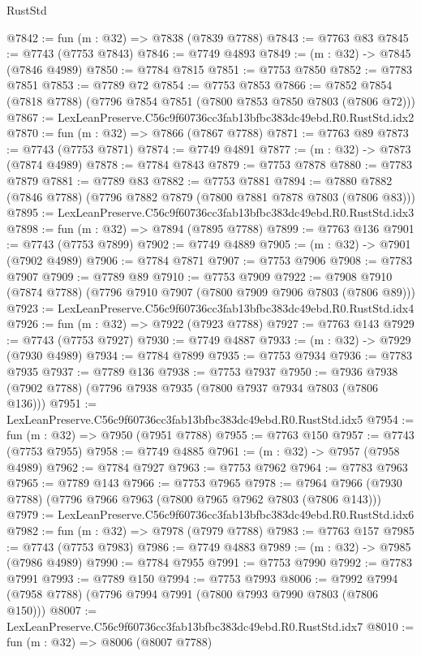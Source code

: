 \begin{lexlean}{RustStd}
\begin{coremodule}
@7842 := fun (m : @32) => @7838 (@7839 @7788)
@7843 := @7763 @83
@7845 := @7743 (@7753 @7843)
@7846 := @7749 @4893
@7849 := (m : @32) -> @7845 (@7846 @4989)
@7850 := @7784 @7815
@7851 := @7753 @7850
@7852 := @7783 @7851
@7853 := @7789 @72
@7854 := @7753 @7853
@7866 := @7852 @7854 (@7818 @7788) (@7796 @7854 @7851 (@7800 @7853 @7850 @7803 (@7806 @72)))
@7867 := LexLeanPreserve.C56c9f60736cc3fab13bfbc383dc49ebd.R0.RustStd.idx2
@7870 := fun (m : @32) => @7866 (@7867 @7788)
@7871 := @7763 @89
@7873 := @7743 (@7753 @7871)
@7874 := @7749 @4891
@7877 := (m : @32) -> @7873 (@7874 @4989)
@7878 := @7784 @7843
@7879 := @7753 @7878
@7880 := @7783 @7879
@7881 := @7789 @83
@7882 := @7753 @7881
@7894 := @7880 @7882 (@7846 @7788) (@7796 @7882 @7879 (@7800 @7881 @7878 @7803 (@7806 @83)))
@7895 := LexLeanPreserve.C56c9f60736cc3fab13bfbc383dc49ebd.R0.RustStd.idx3
@7898 := fun (m : @32) => @7894 (@7895 @7788)
@7899 := @7763 @136
@7901 := @7743 (@7753 @7899)
@7902 := @7749 @4889
@7905 := (m : @32) -> @7901 (@7902 @4989)
@7906 := @7784 @7871
@7907 := @7753 @7906
@7908 := @7783 @7907
@7909 := @7789 @89
@7910 := @7753 @7909
@7922 := @7908 @7910 (@7874 @7788) (@7796 @7910 @7907 (@7800 @7909 @7906 @7803 (@7806 @89)))
@7923 := LexLeanPreserve.C56c9f60736cc3fab13bfbc383dc49ebd.R0.RustStd.idx4
@7926 := fun (m : @32) => @7922 (@7923 @7788)
@7927 := @7763 @143
@7929 := @7743 (@7753 @7927)
@7930 := @7749 @4887
@7933 := (m : @32) -> @7929 (@7930 @4989)
@7934 := @7784 @7899
@7935 := @7753 @7934
@7936 := @7783 @7935
@7937 := @7789 @136
@7938 := @7753 @7937
@7950 := @7936 @7938 (@7902 @7788) (@7796 @7938 @7935 (@7800 @7937 @7934 @7803 (@7806 @136)))
@7951 := LexLeanPreserve.C56c9f60736cc3fab13bfbc383dc49ebd.R0.RustStd.idx5
@7954 := fun (m : @32) => @7950 (@7951 @7788)
@7955 := @7763 @150
@7957 := @7743 (@7753 @7955)
@7958 := @7749 @4885
@7961 := (m : @32) -> @7957 (@7958 @4989)
@7962 := @7784 @7927
@7963 := @7753 @7962
@7964 := @7783 @7963
@7965 := @7789 @143
@7966 := @7753 @7965
@7978 := @7964 @7966 (@7930 @7788) (@7796 @7966 @7963 (@7800 @7965 @7962 @7803 (@7806 @143)))
@7979 := LexLeanPreserve.C56c9f60736cc3fab13bfbc383dc49ebd.R0.RustStd.idx6
@7982 := fun (m : @32) => @7978 (@7979 @7788)
@7983 := @7763 @157
@7985 := @7743 (@7753 @7983)
@7986 := @7749 @4883
@7989 := (m : @32) -> @7985 (@7986 @4989)
@7990 := @7784 @7955
@7991 := @7753 @7990
@7992 := @7783 @7991
@7993 := @7789 @150
@7994 := @7753 @7993
@8006 := @7992 @7994 (@7958 @7788) (@7796 @7994 @7991 (@7800 @7993 @7990 @7803 (@7806 @150)))
@8007 := LexLeanPreserve.C56c9f60736cc3fab13bfbc383dc49ebd.R0.RustStd.idx7
@8010 := fun (m : @32) => @8006 (@8007 @7788)

\end{coremodule}
\end{lexlean}
